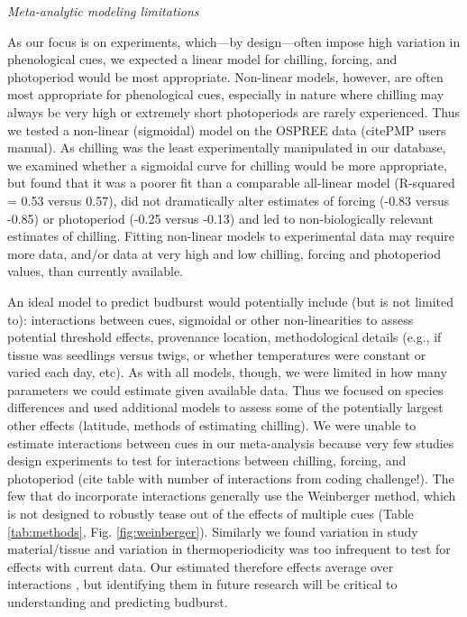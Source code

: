 \documentclass{article}
\begin{document}
\noindent \emph{Meta-analytic modeling limitations}
\par As our focus is on experiments, which---by design---often impose high variation in phenological cues, we expected a linear model for chilling, forcing, and photoperiod would be most appropriate. Non-linear models, however, are often most appropriate for phenological cues, especially in nature where chilling may always be very high or extremely short photoperiods are rarely experienced. Thus we tested a non-linear (sigmoidal) model on the OSPREE data (citePMP users manual). As chilling was the least experimentally manipulated in our database, we examined whether a sigmoidal curve for chilling would be more appropriate, but found that it was a poorer fit than a comparable all-linear model (R-squared = 0.53 versus 0.57), did not dramatically alter estimates of forcing (-0.83 versus -0.85) or photoperiod (-0.25 versus -0.13) and led to non-biologically relevant estimates of chilling. Fitting non-linear models to experimental data may require more data, and/or data at very high and low chilling, forcing and photoperiod values, than currently available.
\par An ideal model to predict budburst would potentially include (but is not limited to): interactions between cues, sigmoidal or other non-linearities to assess potential threshold effects, provenance location, methodological details (e.g., if tissue was seedlings versus twigs, or whether temperatures were constant or varied each day, etc). As with all models, though, we were limited in how many parameters we could estimate given available data. Thus we focused on species differences and used additional models to assess some of the potentially largest other effects (latitude, methods of estimating chilling). We were unable to estimate interactions between cues in our meta-analysis because very few studies design experiments to test for interactions between chilling, forcing, and photoperiod (cite table with number of interactions from coding challenge!). The few that do incorporate interactions generally use the Weinberger method, which is not designed to robustly tease out of the effects of multiple cues (Table \ref{tab:methods}, Fig. \ref{fig:weinberger}).  Similarly we found variation in study material/tissue and variation in thermoperiodicity was too infrequent to test for effects with current data. Our estimated therefore effects average over interactions \citep{gelman2006}, but identifying them in future research will be critical to understanding and predicting budburst. 
\end{document}
